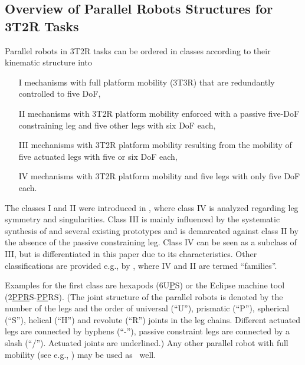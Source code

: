 \documentclass[robotics,article,accept,moreauthors,pdftex]{Definitions/mdpi}
\begin{document}
\subsection{Overview of Parallel Robots Structures for 3T2R Tasks}
\label{sec:parrob_classification}

Parallel robots in 3T2R tasks can be ordered in classes according to their kinematic structure into
\begin{itemize}
	\item[I] mechanisms with full platform mobility (3T3R) that are redundantly controlled to five DoF,
	\item[II] mechanisms with 3T2R platform mobility enforced with a passive five-DoF constraining leg and five other legs with six DoF each,
	\item[III] mechanisms with 3T2R platform mobility resulting from the mobility of five actuated legs with five or six DoF each,
	\item[IV] mechanisms with 3T2R platform mobility and five legs with only five DoF each.
\end{itemize}

The classes I and II were introduced in \cite{Tale-MasoulehGos2011}, where class IV is analyzed regarding leg symmetry and singularities.
Class III is mainly influenced by the systematic synthesis of \cite{Gogu2008} and several existing prototypes and is demarcated against class II by the absence of the passive constraining leg.
Class IV can be seen as a subclass of III, but is differentiated in this paper due to its characteristics.
Other classifications are provided e.g., by \cite{HuangLiuChe2011}, where IV and II are termed ``families''.

Examples for the first class are hexapods (6U\underline{P}S) \cite{MerletPerDan2000} or the Eclipse \cite{HongKim2000} machine tool (2\underline{PPR}S-\underline{PP}RS).
(The joint structure of the parallel robots is denoted by the number of the legs and the order of universal (``U''), prismatic (``P''), spherical (``S''), helical (``H'') and revolute (``R'') joints in the leg chains. Different actuated legs are connected by hyphens (``-''), passive constraint legs are connected by a slash (``/''). Actuated joints are underlined.)
Any other parallel robot with full mobility (see e.g., \cite{Merlet2006,Gogu2008,Zhang2009}) may be used as~ well.
\end{document}
